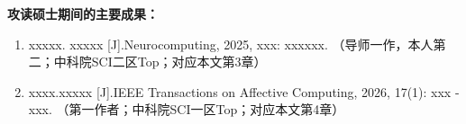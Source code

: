 
\singleappendix

{\par\bfseries \noindent 攻读硕士期间的主要成果：}
\begin{enumerate}
  \item  xxxxx. \newblock xxxxx [J].\newblock Neurocomputing, 2025, xxx: xxxxxx. （导师一作，本人第二；中科院SCI二区Top；对应本文第3章）
  \item xxxx.\newblock xxxxx [J].\newblock IEEE Transactions on Affective Computing, 2026, 17(1): xxx - xxx. （第一作者；中科院SCI一区Top；对应本文第4章）
\end{enumerate}